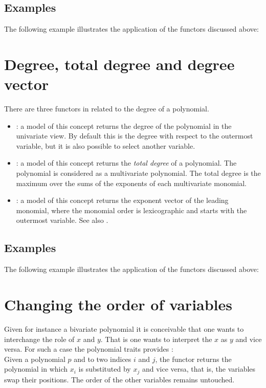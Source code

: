 \subsection{Examples}
The following example illustrates the application of the functors 
discussed above:

\section{Degree, total degree and degree vector}

There are three functors in  
related to the degree of a polynomial. 
\begin{itemize}
\item {}: 
a model of this concept returns the degree of the polynomial in the univariate 
view. By default this is the degree with respect to the outermost variable, 
but it is also possible to select another variable. 
\item {}: 
a model of this concept returns the {\em total degree} of a polynomial. 
The polynomial is considered as a multivariate polynomial. 
The total degree is the maximum over the sums of the exponents of each 
multivariate monomial. 
\item {}:
a model of this concept returns the exponent vector of the leading monomial,
where the monomial order is lexicographic and starts with the outermost 
variable. See also  . 
\end{itemize}

\subsection{Examples}
The following example illustrates the application of the functors discussed 
above:

\section{Changing the order of variables}

Given for instance a bivariate polynomial it is conceivable that one wants to 
interchange the role of $x$ and $y$. That is one wants to interpret the 
$x$ as $y$ and vice versa.
For such a case the polynomial traits provides :\\
Given a polynomial $p$ and to two indices $i$ and $j$, 
the functor returns the polynomial in which $x_i$ is substituted by $x_j$ and 
vice versa, that is, the variables swap their positions.
The order of the other variables remains untouched. 

